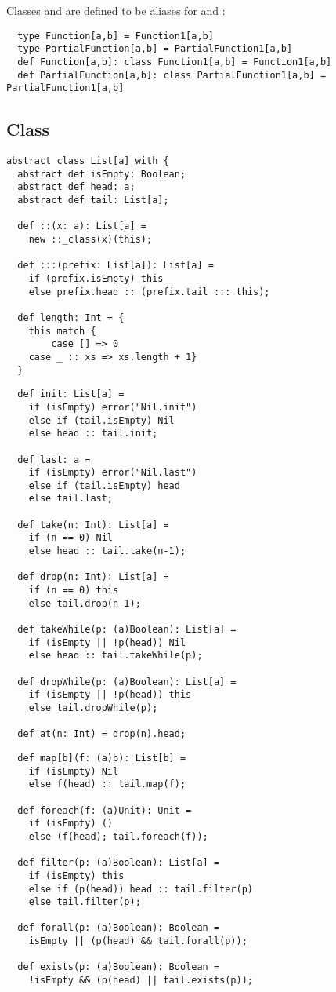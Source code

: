 \documentclass[a4paper,12pt,twoside,titlepage]{book}
\begin{document}
Classes  and  are defined to be aliases for
 and :
\begin{lstlisting}
  type Function[a,b] = Function1[a,b]
  type PartialFunction[a,b] = PartialFunction1[a,b]
  def Function[a,b]: class Function1[a,b] = Function1[a,b]
  def PartialFunction[a,b]: class PartialFunction1[a,b] = PartialFunction1[a,b]
\end{lstlisting}

\subsection{Class }\label{cls-list}

\begin{lstlisting}
abstract class List[a] with {
  abstract def isEmpty: Boolean;
  abstract def head: a;
  abstract def tail: List[a];

  def ::(x: a): List[a] =
    new ::_class(x)(this);

  def :::(prefix: List[a]): List[a] =
    if (prefix.isEmpty) this
    else prefix.head :: (prefix.tail ::: this);

  def length: Int = {
    this match {
        case [] => 0
    case _ :: xs => xs.length + 1}
  }
\end{lstlisting}
\begin{lstlisting}
  def init: List[a] =
    if (isEmpty) error("Nil.init")
    else if (tail.isEmpty) Nil
    else head :: tail.init;

  def last: a =
    if (isEmpty) error("Nil.last")
    else if (tail.isEmpty) head
    else tail.last;

  def take(n: Int): List[a] =
    if (n == 0) Nil
    else head :: tail.take(n-1);

  def drop(n: Int): List[a] =
    if (n == 0) this
    else tail.drop(n-1);

  def takeWhile(p: (a)Boolean): List[a] =
    if (isEmpty || !p(head)) Nil
    else head :: tail.takeWhile(p);

  def dropWhile(p: (a)Boolean): List[a] =
    if (isEmpty || !p(head)) this
    else tail.dropWhile(p);

  def at(n: Int) = drop(n).head;
\end{lstlisting}
\begin{lstlisting}
  def map[b](f: (a)b): List[b] =
    if (isEmpty) Nil
    else f(head) :: tail.map(f);

  def foreach(f: (a)Unit): Unit =
    if (isEmpty) ()
    else (f(head); tail.foreach(f));

  def filter(p: (a)Boolean): List[a] =
    if (isEmpty) this
    else if (p(head)) head :: tail.filter(p)
    else tail.filter(p);

  def forall(p: (a)Boolean): Boolean =
    isEmpty || (p(head) && tail.forall(p));

  def exists(p: (a)Boolean): Boolean =
    !isEmpty && (p(head) || tail.exists(p));
\end{lstlisting}
\end{document}

